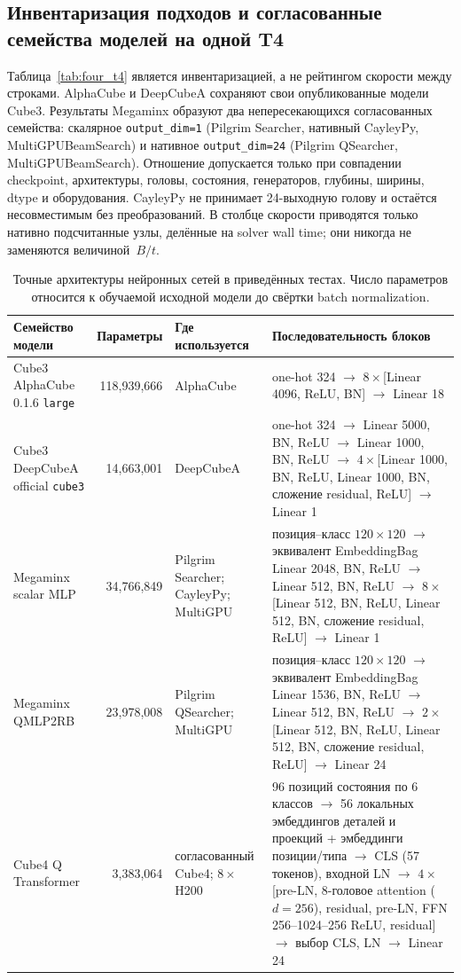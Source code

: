 \documentclass[10pt,twocolumn]{article}
\begin{document}
\subsection{Инвентаризация подходов и согласованные семейства моделей на одной T4}
Таблица~\ref{tab:four_t4} является инвентаризацией, а не рейтингом скорости
между строками. AlphaCube и DeepCubeA сохраняют свои опубликованные модели
Cube3. Результаты Megaminx образуют два непересекающихся согласованных семейства:
скалярное \texttt{output\_dim=1} (Pilgrim Searcher, нативный CayleyPy,
MultiGPUBeamSearch) и нативное \texttt{output\_dim=24} (Pilgrim QSearcher,
MultiGPUBeamSearch). Отношение допускается только при совпадении checkpoint,
архитектуры, головы, состояния, генераторов, глубины, ширины, dtype и
оборудования. CayleyPy не принимает 24-выходную голову и остаётся несовместимым
без преобразований. В столбце
скорости приводятся только нативно подсчитанные узлы, делённые на solver wall
time; они никогда не заменяются величиной~$B/t$.

\begin{table}[t]
\centering
\small
\setlength{\tabcolsep}{3pt}
\caption{Точные архитектуры нейронных сетей в приведённых тестах. Число
параметров относится к обучаемой исходной модели до свёртки batch normalization.}
\label{tab:model_architectures}
\renewcommand{\arraystretch}{1.12}
\begin{tabularx}{\textwidth}{@{}L{2.6cm}rL{2.8cm}Y@{}}
\toprule
Семейство модели & Параметры & Где используется & Последовательность блоков \\
\midrule
Cube3 AlphaCube 0.1.6 \texttt{large} & 118,939,666 & AlphaCube & one-hot 324 $\to$ $8\times$[Linear 4096, ReLU, BN] $\to$ Linear 18 \\
Cube3 DeepCubeA official \texttt{cube3} & 14,663,001 & DeepCubeA & one-hot 324 $\to$ Linear 5000, BN, ReLU $\to$ Linear 1000, BN, ReLU $\to$ $4\times$[Linear 1000, BN, ReLU, Linear 1000, BN, сложение residual, ReLU] $\to$ Linear 1 \\
Megaminx scalar MLP & 34,766,849 & Pilgrim Searcher; CayleyPy; MultiGPU & позиция--класс $120\times120$ $\to$ эквивалент EmbeddingBag Linear 2048, BN, ReLU $\to$ Linear 512, BN, ReLU $\to$ $8\times$[Linear 512, BN, ReLU, Linear 512, BN, сложение residual, ReLU] $\to$ Linear 1 \\
Megaminx QMLP2RB & 23,978,008 & Pilgrim QSearcher; MultiGPU & позиция--класс $120\times120$ $\to$ эквивалент EmbeddingBag Linear 1536, BN, ReLU $\to$ Linear 512, BN, ReLU $\to$ $2\times$[Linear 512, BN, ReLU, Linear 512, BN, сложение residual, ReLU] $\to$ Linear 24 \\
Cube4 Q Transformer & 3,383,064 & согласованный Cube4; $8\times$H200 & 96 позиций состояния по 6 классов $\to$ 56 локальных эмбеддингов деталей и проекций + эмбеддинги позиции/типа $\to$ CLS (57 токенов), входной LN $\to$ $4\times$[pre-LN, 8-головое attention ($d=256$), residual, pre-LN, FFN 256--1024--256 ReLU, residual] $\to$ выбор CLS, LN $\to$ Linear 24 \\
\bottomrule
\end{tabularx}
\end{table}
\end{document}
